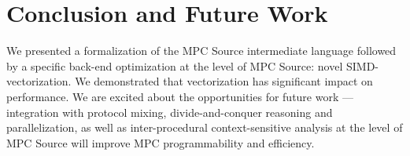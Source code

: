 \documentclass[sigconf, screen, review, natbib=false, dvipsnames, table]{acmart}
\theoremstyle{definition}
\begin{document}













%
%

\section{Conclusion and Future Work}
\label{sec:conclusion}

We presented a formalization of the MPC Source intermediate language followed by a specific back-end optimization at the level of MPC Source: novel SIMD-vectorization. We demonstrated that vectorization has significant impact on performance. 
We are excited about the opportunities for future work --- integration with protocol mixing, divide-and-conquer reasoning and parallelization, as well as inter-procedural context-sensitive analysis at the level of MPC Source will improve MPC programmability and efficiency. 

%




%
%



\end{document}
